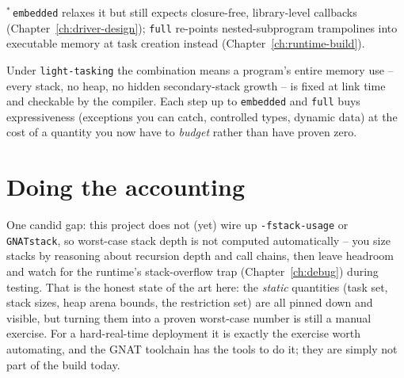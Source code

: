 \noindent$^{*}$\,\texttt{embedded} relaxes it but still expects closure-free,
library-level callbacks (Chapter~\ref{ch:driver-design}); \texttt{full} re-points
nested-subprogram trampolines into executable memory at task creation instead
(Chapter~\ref{ch:runtime-build}).

Under \texttt{light-tasking} the combination means a program's entire memory use --
every stack, no heap, no hidden secondary-stack growth -- is fixed at link time and
checkable by the compiler. Each step up to \texttt{embedded} and \texttt{full} buys
expressiveness (exceptions you can catch, controlled types, dynamic data) at the
cost of a quantity you now have to \emph{budget} rather than have proven zero.

\section{Doing the accounting}

One candid gap: this project does not (yet) wire up
\texttt{-fstack-usage} or \texttt{GNATstack}, so worst-case stack depth is not
computed automatically -- you size stacks by reasoning about recursion depth and
call chains, then leave headroom and watch for the runtime's stack-overflow trap
(Chapter~\ref{ch:debug}) during testing. That is the honest state of the art here:
the \emph{static} quantities (task set, stack sizes, heap arena bounds, the
restriction set) are all pinned down and visible, but turning them into a proven
worst-case number is still a manual exercise. For a hard-real-time deployment it is
exactly the exercise worth automating, and the GNAT toolchain has the tools to do
it; they are simply not part of the build today.

